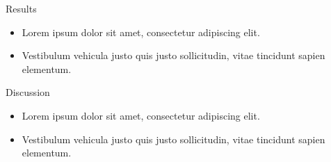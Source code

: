 \documentclass{beamer}
\begin{document}
\begin{frame}{Results}
    \begin{itemize}
        \item Lorem ipsum dolor sit amet, consectetur adipiscing elit.
        \item Vestibulum vehicula justo quis justo sollicitudin, vitae tincidunt sapien elementum.
    \end{itemize}
\end{frame}

\begin{frame}{Discussion}
    \begin{itemize}
        \item Lorem ipsum dolor sit amet, consectetur adipiscing elit.
        \item Vestibulum vehicula justo quis justo sollicitudin, vitae tincidunt sapien elementum.
    \end{itemize}
\end{frame}
\end{document}
